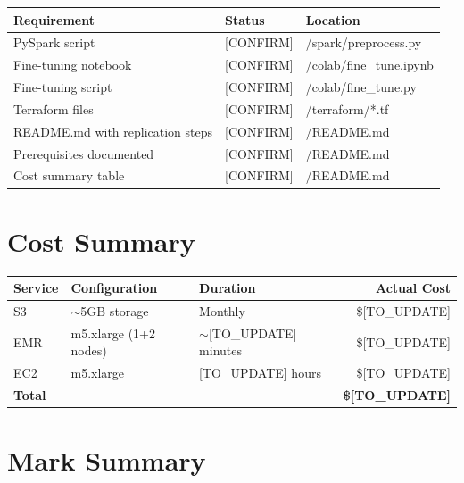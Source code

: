 \documentclass[11pt,a4paper]{article}
\begin{document}
\begin{table}[H]
\centering
\begin{tabular}{@{}lll@{}}
\toprule
\textbf{Requirement} & \textbf{Status} & \textbf{Location} \\
\midrule
PySpark script & [CONFIRM] & /spark/preprocess.py \\
Fine-tuning notebook & [CONFIRM] & /colab/fine\_tune.ipynb \\
Fine-tuning script & [CONFIRM] & /colab/fine\_tune.py \\
Terraform files & [CONFIRM] & /terraform/*.tf \\
README.md with replication steps & [CONFIRM] & /README.md \\
Prerequisites documented & [CONFIRM] & /README.md \\
Cost summary table & [CONFIRM] & /README.md \\
\bottomrule
\end{tabular}
\end{table}

\section{Cost Summary}

\begin{table}[H]
\centering
\begin{tabular}{@{}lllr@{}}
\toprule
\textbf{Service} & \textbf{Configuration} & \textbf{Duration} & \textbf{Actual Cost} \\
\midrule
S3 & $\sim$5GB storage & Monthly & \$[TO\_UPDATE] \\
EMR & m5.xlarge (1+2 nodes) & $\sim$[TO\_UPDATE] minutes & \$[TO\_UPDATE] \\
EC2 & m5.xlarge & [TO\_UPDATE] hours & \$[TO\_UPDATE] \\
\midrule
\textbf{Total} & & & \textbf{\$[TO\_UPDATE]} \\
\bottomrule
\end{tabular}
\end{table}

\section{Mark Summary}
\end{document}
